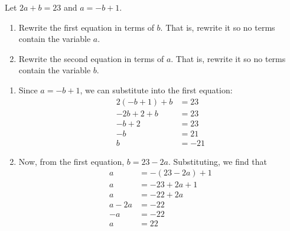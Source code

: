 \documentclass[noauthor]{ximera}
\begin{document}
\begin{problem}
Let \(2a + b = 23\) and \(a = -b + 1\). 
\begin{enumerate}
    \item Rewrite the first equation in terms of \(b\). That is, rewrite it so no terms contain the variable \(a\).
    \item Rewrite the second equation in terms of \(a\). That is, rewrite it so no terms contain the variable \(b\).
\end{enumerate}

\begin{explanation}
    \begin{enumerate}
        \item Since \(a = -b + 1\), we can substitute into the first equation:
        \begin{align*}
            2(-b + 1) + b & = 23 \\
            -2b + 2 + b & = 23 \\
            -b + 2 & = 23 \\
            -b & = 21 \\
            b & = -21
        \end{align*}
        \item Now, from the first equation, \(b = 23 - 2a\). Substituting, we find that
        \begin{align*}
            a & = -(23 - 2a) + 1 \\
            a & = -23 + 2a + 1 \\
            a & = -22 + 2a \\
            a - 2a & = -22 \\
            -a & = -22 \\
            a & = 22
        \end{align*}
    \end{enumerate}
\end{explanation}
\end{problem}
\end{document}
